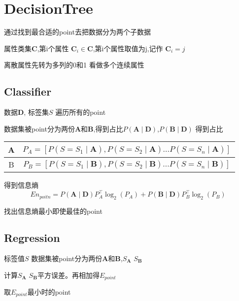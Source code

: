 \documentclass{ctexart}
\newcommand{\bb}[1]{\mathbf{#1}} %
\newcommand{\bmA}{\bb{A}}
\newcommand{\bmB}{\bb{B}}
\newcommand{\bmC}{\bb{C}}
\newcommand{\bmD}{\bb{D}}
\begin{document}
\newpage
\section{DecisionTree}
通过找到最合适的point去把数据分为两个子数据

属性类集$ \bmC $,第i个属性 $ \bmC_i \in \bmC $,第i个属性取值为j,记作 $\bmC_i = j$

离散属性先转为多列的0和1 看做多个连续属性

\subsection{Classifier}

数据$\bmD$, 标签集$S$
遍历所有的point

数据集被point分为两份$\bmA$和$\bmB$,得到占比$P(\bmA \mid \bmD)$,$P(\bmB \mid \bmD)$
得到占比
\begin{center}
    \begin{tabular}{|c|c|}
        \hline
        A & $P_A = [P(S = S_1 \mid \bmA),P(S = S_2 \mid \bmA) \dots P(S = S_n \mid \bmA)]$ \\ \hline
        B & $P_B = [P(S = S_1 \mid \bmB),P(S = S_2 \mid \bmB) \dots P(S = S_n \mid \bmB)]$ \\ \hline
    \end{tabular}
\end{center}

得到信息熵
$$
En_{poitn} = P(\bmA \mid \bmD) P_A^\top \log_2(P_A) + P(\bmB \mid \bmD) P_B^\top \log_2(P_B)
$$

找出信息熵最小即使最佳的point

\subsection{Regression}
标签值$S$
数据集被point分为两份$\bmA$和$\bmB$,$S_\bmA$ $S_\bmB$

计算$S_\bmA$ $S_\bmB$平方误差。再相加得$E_{point}$

取$E_{point}$最小时的point
\end{document}
